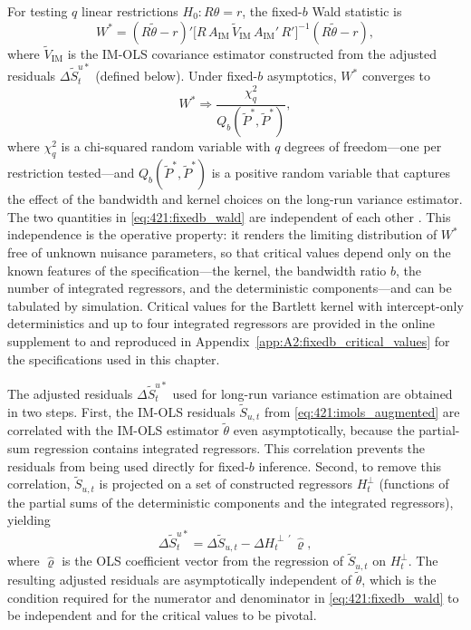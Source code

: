 For testing $q$ linear restrictions $H_0: R\theta = r$, the
fixed-$b$ Wald statistic is
\begin{equation}
	W^{*} = (R\tilde{\theta} - r)'
	\bigl[R\, A_{\text{IM}}\, \tilde{V}_{\text{IM}}\,
	A_{\text{IM}}'\, R'\bigr]^{-1}
	(R\tilde{\theta} - r),
	\label{eq:421:fixedb_wald_stat}
\end{equation}
where $\tilde{V}_{\text{IM}}$ is the IM-OLS covariance estimator
constructed from the adjusted residuals
$\Delta\tilde{S}^{u*}_t$ (defined below). Under fixed-$b$
asymptotics, $W^{*}$ converges to
\begin{equation}
	W^{*} \Rightarrow \frac{\chi^2_q}{Q_b(\tilde{P}^{*},
		\tilde{P}^{*})},
	\label{eq:421:fixedb_wald}
\end{equation}
where $\chi^2_q$ is a chi-squared random variable with $q$
degrees of freedom---one per restriction tested---and
$Q_b(\tilde{P}^{*}, \tilde{P}^{*})$ is a positive random
variable that captures the effect of the bandwidth and kernel
choices on the long-run variance estimator. The two quantities
in \eqref{eq:421:fixedb_wald} are independent of each other
\citep[Lemma 2, Proposition 3]{VogelsangWagner2014}. This
independence is the operative property: it renders the limiting
distribution of $W^{*}$ free of unknown nuisance parameters, so
that critical values depend only on the known features of the
specification---the kernel, the bandwidth ratio $b$, the number
of integrated regressors, and the deterministic components---and
can be tabulated by simulation. Critical values for the Bartlett
kernel with intercept-only deterministics and up to four
integrated regressors are provided in the online supplement to
\citet{VogelsangWagner2014} and reproduced in
Appendix~\ref{app:A2:fixedb_critical_values} for the
specifications used in this chapter.

The adjusted residuals $\Delta\tilde{S}^{u*}_t$ used for
long-run variance estimation are obtained in two steps. First,
the IM-OLS residuals $\tilde{S}_{u,t}$ from
\eqref{eq:421:imols_augmented} are correlated with the IM-OLS
estimator $\tilde{\theta}$ even asymptotically, because the
partial-sum regression contains integrated regressors. This
correlation prevents the residuals from being used directly
for fixed-$b$ inference. Second, to remove this correlation,
$\tilde{S}_{u,t}$ is projected on a set of constructed
regressors $H_t^{\perp}$ (functions of the partial sums of the
deterministic components and the integrated regressors), yielding
\begin{equation}
	\Delta\tilde{S}^{u*}_t = \Delta\tilde{S}_{u,t}
	- \Delta H_t^{\perp\,\prime}\,\hat{\varrho},
	\label{eq:421:adjusted_residuals}
\end{equation}
where $\hat{\varrho}$ is the OLS coefficient vector from the
regression of $\tilde{S}_{u,t}$ on $H_t^{\perp}$. The resulting
adjusted residuals are asymptotically independent of
$\tilde{\theta}$, which is the condition required for the
numerator and denominator in \eqref{eq:421:fixedb_wald} to be
independent and for the critical values to be pivotal.

